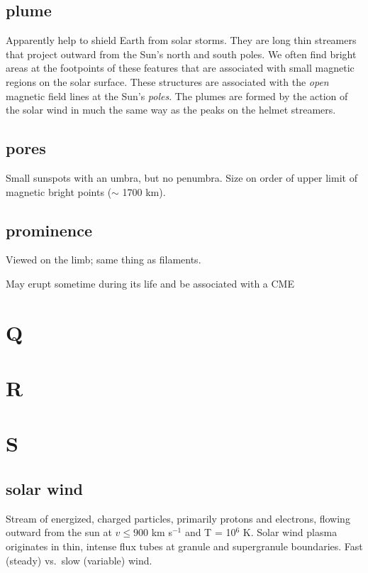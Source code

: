 \documentclass[12pt]{article}
\begin{document}
\subsection*{plume}
Apparently help to shield Earth from solar storms.
They are long thin streamers that project outward from the Sun's north and
south poles. We often find bright areas at the footpoints of these
features that are associated with small magnetic regions on the solar
surface. These structures are associated with the \emph{open} magnetic
field lines at the Sun's \emph{poles}. The plumes are formed by the action of
the solar wind in much the same way as the peaks on the helmet
streamers.

\subsection*{pores}
Small sunspots with an umbra, but no penumbra.
Size on order of upper limit of magnetic bright points ($\sim$ 1700
km).

\subsection*{prominence}
    \begin{itemize*}
        \item Viewed on the limb; same thing as filaments.
        \item May erupt sometime during its life and be associated
        with a CME
    \end{itemize*}

\section{Q}
\section{R}
\section{S}
\subsection*{solar wind}
Stream of energized, charged particles, primarily protons and electrons,
flowing outward from the sun at $v \leq 900$ km s$^{-1}$ and T = 10$^6$ K.
Solar wind plasma originates in thin, intense flux tubes at granule
and supergranule boundaries. Fast (steady) vs.\ slow (variable) wind.
\end{document}
